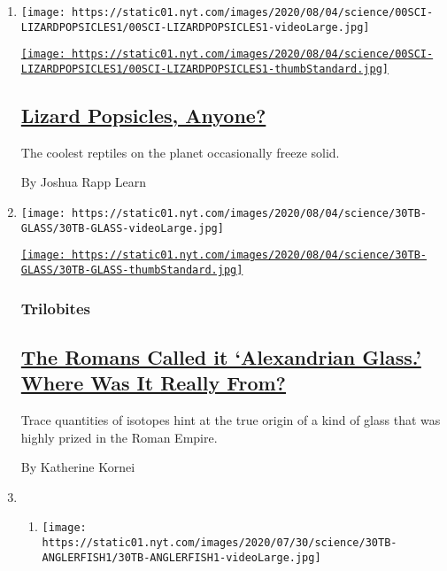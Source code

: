 \begin{enumerate}
\def\labelenumi{\arabic{enumi}.}
\item
  \texttt{[image: https://static01.nyt.com/images/2020/08/04/science/00SCI-LIZARDPOPSICLES1/00SCI-LIZARDPOPSICLES1-videoLarge.jpg]}

  \href{/2020/07/31/science/lizards-liolaemus-argentina.html}{\texttt{[image: https://static01.nyt.com/images/2020/08/04/science/00SCI-LIZARDPOPSICLES1/00SCI-LIZARDPOPSICLES1-thumbStandard.jpg]}}

  \hypertarget{lizard-popsicles-anyone}{%
  \subsection{\texorpdfstring{\href{/2020/07/31/science/lizards-liolaemus-argentina.html}{Lizard
  Popsicles,
  Anyone?}}{Lizard Popsicles, Anyone?}}\label{lizard-popsicles-anyone}}

  The coolest reptiles on the planet occasionally freeze solid.

  By Joshua Rapp Learn
\item
  \texttt{[image: https://static01.nyt.com/images/2020/08/04/science/30TB-GLASS/30TB-GLASS-videoLarge.jpg]}

  \href{/2020/07/31/science/alexandrian-glass-rome.html}{\texttt{[image: https://static01.nyt.com/images/2020/08/04/science/30TB-GLASS/30TB-GLASS-thumbStandard.jpg]}}

  \hypertarget{trilobites}{%
  \subsubsection{Trilobites}\label{trilobites}}

  \hypertarget{the-romans-called-it-alexandrian-glass-where-was-it-really-from}{%
  \subsection{\texorpdfstring{\href{/2020/07/31/science/alexandrian-glass-rome.html}{The
  Romans Called it `Alexandrian Glass.' Where Was It Really
  From?}}{The Romans Called it `Alexandrian Glass.' Where Was It Really From?}}\label{the-romans-called-it-alexandrian-glass-where-was-it-really-from}}

  Trace quantities of isotopes hint at the true origin of a kind of
  glass that was highly prized in the Roman Empire.

  By Katherine Kornei
\item
  \begin{enumerate}
  \def\labelenumii{\arabic{enumii}.}
  \item
    \texttt{[image: https://static01.nyt.com/images/2020/07/30/science/30TB-ANGLERFISH1/30TB-ANGLERFISH1-videoLarge.jpg]}


\end{enumerate}
\end{enumerate}
